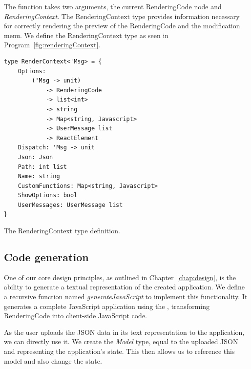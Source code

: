 The function takes two arguments, the current RenderingCode node and \emph{RenderingContext}.
The RenderingContext type provides information necessary for correctly rendering the preview of the RenderingCode and the modification menu.
We define the RenderingContext type as seen in Program~\ref{fig:renderingContext}.
\begin{listing}[htpb]
	\begin{lstlisting}
type RenderContext<'Msg> = {
    Options:
        ('Msg -> unit)
            -> RenderingCode
            -> list<int>
            -> string
            -> Map<string, Javascript>
            -> UserMessage list
            -> ReactElement
    Dispatch: 'Msg -> unit
    Json: Json
    Path: int list
    Name: string
    CustomFunctions: Map<string, Javascript>
    ShowOptions: bool
    UserMessages: UserMessage list
}
      \end{lstlisting}
	\caption{The RenderingContext type definition.}\label{fig:renderingContext}
\end{listing}


\clearpage
\subsection{Code generation}

One of our core design principles, as outlined in Chapter~\ref{chap:design},
is the ability to generate a textual representation of the created application.
We define a recursive function named \emph{generateJavaScript} to implement this functionality.
It generates a complete JavaScript application using the \citet{elm-arch}, transforming RenderingCode into client-side JavaScript code.

As the user uploads the JSON data in its text representation to the application, we can directly use it.
We create the \emph{Model} type, equal to the uploaded JSON and representing the application's state.
This then allows us to reference this model and also change the state.

